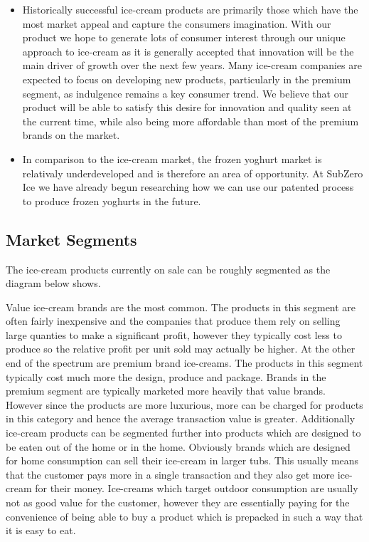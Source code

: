 \documentclass{article}
\begin{document}
\begin{itemize}
  \item Historically successful ice-cream products are primarily those which have the most market appeal and capture the consumers imagination. With our product we hope to generate lots of consumer interest through our unique approach to ice-cream as it is generally accepted that innovation will be the main driver of growth over the next few years. Many ice-cream companies are expected to focus on developing new products, particularly in the premium segment, as indulgence remains a key consumer trend. We believe that our product will be able to satisfy this desire for innovation and quality seen at the current time, while also being more affordable than most of the premium brands on the market.

  \item In comparison to the ice-cream market, the frozen yoghurt market is relativaly underdeveloped and is therefore an area of opportunity. At SubZero Ice we have already begun researching how we can use our patented process to produce frozen yoghurts in the future.

  \end{itemize}


  \subsection{Market Segments}

  The ice-cream products currently on sale can be roughly segmented as the diagram below shows.

  Value ice-cream brands are the most common. The products in this segment are often fairly inexpensive and the companies that produce them rely on selling large quanties to make a significant profit, however they typically cost less to produce so the relative profit per unit sold may actually be higher. At the other end of the spectrum are premium brand ice-creams. The products in this segment typically cost much more the design, produce and package. Brands in the premium segment are typically marketed more heavily that value brands. However since the products are more luxurious, more can be charged for products in this category and hence the average transaction value is greater. Additionally ice-cream products can be segmented further into products which are designed to be eaten out of the home or in the home. Obviously brands which are designed for home consumption can sell their ice-cream in larger tubs. This usually means that the customer pays more in a single transaction and they also get more ice-cream for their money. Ice-creams which target outdoor consumption are usually not as good value for the customer, however they are essentially paying for the convenience of being able to buy a product which is prepacked in such a way that it is easy to eat.
\end{document}
